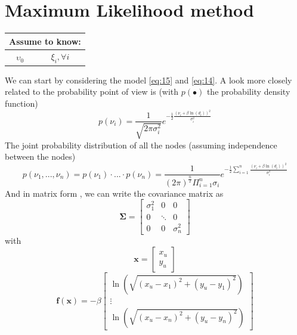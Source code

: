 \documentclass[12pt]{report}
\begin{document}
\section{Maximum Likelihood method}
\begin{center}
    \begin{tabular}{ |c|c| } 
    \hline
    \multicolumn{2}{|c|}{ \textbf{Assume to know:} } \\
    \hline
    $\upsilon_0$ & $\xi_i,\forall i$ \\
    \hline
    \end{tabular}
\end{center}
We can start by considering the model \eqref{eq:15} and \eqref{eq:14}.
A look more closely related to the probability point of view is (with $p(\bullet)$ the probability density function)
\begin{equation}
    p(\nu_i)=\frac{1}{\sqrt{2\pi\sigma^2_i}}e^{-\frac{1}{2}\frac{(\nu_i+\beta\ln(d_i))^2}{\sigma^2_i}}
\end{equation}
The joint probability distribution of all the nodes (assuming independence between the nodes) \begin{equation}
    p(\nu_1,...,\nu_n)=p(\nu_1)\cdot...\cdot p(\nu_n)=\frac{1}{(2\pi)^{\frac{n}{2}}\Pi_{i=1}^n\sigma_i}e^{-\frac{1}{2}\sum_{i=1}^n\frac{(\nu_i+\beta\ln(d_i))^2}{\sigma^2_i}}
\end{equation}
And in matrix form \cite{rzk}, we can write the covariance matrix as 
\begin{equation}
    \boldsymbol{\Sigma}=\begin{bmatrix}
    \sigma^2_1 & 0 & 0\\
    0 &\ddots& 0\\
    0&0&\sigma^2_n
    \end{bmatrix}
\end{equation}
with
\begin{equation}
    \mathbf{x}=\begin{bmatrix}
    x_u\\
    y_u
    \end{bmatrix}
\end{equation}
\begin{equation}
    \mathbf{f}(\mathbf{x})=-\beta\begin{bmatrix}
\ln(\sqrt{(x_u-x_1)^2+(y_u-y_1)^2})\\
\vdots\\
\ln(\sqrt{(x_u-x_n)^2+(y_u-y_n)^2})
\end{bmatrix}
\end{equation}
\end{document}
